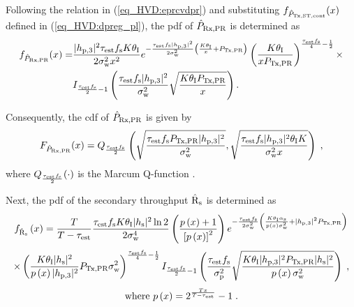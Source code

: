 Following the relation in (\ref{eq_HVD:eprcvdpr}) and substituting $f_{\hat{P}_{\text{Tx,ST,cont}}}(x)$ defined in (\ref{eq_HVD:dpreg_pl}), the pdf of $\hat{P}_{\text{Rx,PR}}$ is determined as 
\begin{align}
f_{\hat{P}_{\text{Rx,PR}}}(x) =& \frac{|h_{\text{p,3}}|^2 \tau_{\text{est}} f_{\text{s}} K \theta_{\text{I}}}{2\sigma^2_{\text{w}} x^2} e^{- \frac{\tau_{\text{est}} f_{\text{s}} |h_{\text{p,3}}|^2}{2 \sigma^2_{\text{w}}}\left( \frac{K  \theta_{\text{I}}}{x} + P_{\text{Tx,PR}} \right)} \left( \frac{K \theta_{\text{I}}}{x P_{\text{Tx,PR}}}   \right)^{\frac{\tau_{\text{est}} f_{\text{s}}}{4} - \frac{1}{2}} \times \label{eq_HVD:dpp_pl} \\
\quad & I_{\frac{\tau_{\text{est}} f_{\text{s}}}{2}  - 1}\left( \frac{\tau_{\text{est}} f_{\text{s}} |h_{\text{p,3}}|^2}{\sigma^2_{\text{w}}} \sqrt{\frac{ K \theta_{\text{I}} P_{\text{Tx,PR}}}{x}}  \right). \nonumber
\end{align}

Consequently, the cdf of $\hat{P}_{\text{Rx,PR}}$ is given by %
\begin{equation}
	\label{eq_HVD:cdf}
	\fprcvdpr(x) = Q_{\frac{\test \fsam}{2}}\left(\sqrt{\frac{\test \fsam \ptran \phpth}{\npp}},\sqrt{\frac{\test \fsam \phpth \ite K}{\npp x}}\right) \;  ,
\end{equation}
where $Q_{\frac{\tau_{\text{est}} f_{\text{s}}}{2}}(\cdot)$ is the Marcum Q-function \cite{Jef00}.

Next, the pdf of the secondary throughput $\hat{\text{{R}}}_{\text{s}}$ is determined as
\begin{equation}
	\label{Rspdf}
	\drs \left(x\right) =
	\frac{T}{T-\test}\frac{\test \fsam K \ite \phs \ln{2}}{2 \npss} 
	\left(\frac{p\left(x\right)+1}{\left[p\left(x\right)\right]^2} \right)
	e^{-\frac{\test \fsam}{2 \npp} \left(\frac{K \theta_\textrm{I} \alpha_\textrm{s}}{p\left(x\right)\nps} + \phpth \ptran \right)}
\end{equation}
\begin{equation*}
	\times \left(\frac{K \theta_{\text{I}} |h_{\text{s}}|^2}{p\left(x\right) |h_{\text{p,3}}|^2} P_{\text{Tx,PR}} \sigma^2_{\text{w}}\right)^{\frac{\tau_{\text{est}} f_{\text{s}}}{4}-\frac{1}{2}}
	I_{\frac{\tau_{\text{est}} f_{\text{s}}}{2}-1}\left(\frac{\tau_{\text{est}} f_{\text{s}}}{\sigma_\textrm{p}^2}\sqrt{\frac{K \theta_{\text{I}} |h_{\text{p,3}}|^2 P_{\text{Tx,PR}} |h_{\text{s}}|^2}{p\left(x\right) \sigma^2_{\text{w}}}}\right) \;  ,
\end{equation*}
\begin{equation*}
\text{where } p\left(x\right) = 2^\frac{Tx}{T-\tau_{\text{est}}}-1 \;  .
\end{equation*} 




